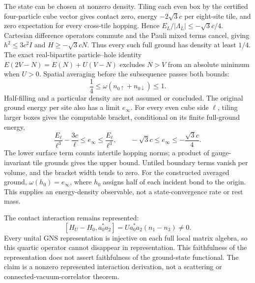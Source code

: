 The state can be chosen at nonzero density.  Tiling each even box by
the certified four-particle cube vector gives contact zero,
energy $-2\sqrt3 c$ per eight-site tile, and zero expectation for every
cross-tile hopping.  Hence $E_L/|\Lambda_L|\le-\sqrt3 c/4$.
Cartesian difference operators commute and the Pauli mixed terms
cancel, giving $h^2\le3c^2I$ and $H\ge-\sqrt3 cN$.
Thus every such full ground has density at least $1/4$.
The exact real-bipartite particle--hole identity
$E(2V-N)=E(N)+U(V-N)$ excludes $N>V$ from an absolute minimum when
$U>0$.  Spatial averaging before the subsequence passes both bounds:
\[
 \frac14\le\omega(n_{0\uparrow}+n_{0\downarrow})\le1.
\]
Half-filling and a particular density are not assumed or concluded.
The original ground energy per site also has a limit $e_\infty$.
For every even cube side $\ell$, tiling larger boxes gives the
computable bracket, conditional on its finite full-ground energy,
\[
 \frac{E_\ell}{\ell^3}-\frac{3c}{\ell}
 \le e_\infty\le\frac{E_\ell}{\ell^3},
 \qquad -\sqrt3 c\le e_\infty\le-\frac{\sqrt3 c}{4}.
\]
The lower surface term counts intertile hopping norms; a product of
gauge-invariant tile grounds gives the upper bound.  Untiled boundary
terms vanish per volume, and the bracket width tends to zero.
For the constructed averaged ground, $\omega(h_0)=e_\infty$, where
$h_0$ assigns half of each incident bond to the origin.  This supplies
an energy-density observable, not a state-convergence rate or rest mass.

The contact interaction remains represented:
\[
 [H_U-H_0,a_0^*a_2]
   =U a_0^*a_2(n_1-n_3)\ne0.
\]
Every unital GNS representation is injective on each full local matrix
algebra, so this quartic operator cannot disappear in representation.
This faithfulness of the representation does not assert faithfulness
of the ground-state functional.  The claim is a nonzero represented
interaction derivation, not a scattering or connected-vacuum-correlator
theorem.

